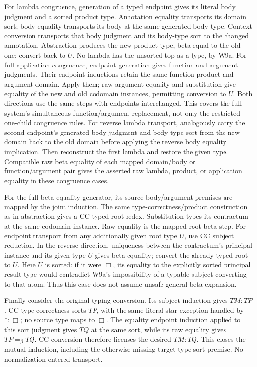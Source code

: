 For lambda congruence, generation of a typed endpoint gives its literal
body judgment and a sorted product type. Annotation equality transports
its domain sort; body equality transports its body at the same generated
body type. Context conversion transports that body judgment and its
body-type sort to the changed annotation. Abstraction produces the new
product type, beta-equal to the old one; convert back to \(U\).
No lambda has the unsorted top as a type, by W9a. For full application
congruence, endpoint generation gives function and argument judgments.
Their endpoint inductions retain the same function product and argument
domain. Apply them; raw argument equality and substitution give equality
of the new and old codomain instances, permitting conversion to \(U\).
Both directions use the same steps with endpoints interchanged.
This covers the full system's simultaneous function/argument replacement,
not only the restricted one-child congruence rules.
For reverse lambda transport, analogously carry the second endpoint's
generated body judgment and body-type sort from the new domain back to
the old domain before applying the reverse body equality implication.
Then reconstruct the first lambda and restore the given type. Compatible
raw beta equality of each mapped domain/body or function/argument pair
gives the asserted raw lambda, product, or application equality in
these congruence cases.

For the full beta equality generator, its source body/argument premises
are mapped by the joint induction. The same type-correctness/product
construction as in abstraction gives a CC-typed root redex. Substitution
types its contractum at the same codomain instance. Raw equality is the
mapped root beta step. For endpoint transport from any additionally
given root type \(U\), use CC subject reduction. In the reverse
direction, uniqueness between the contractum's principal instance and
its given type \(U\) gives beta equality; convert the already typed
root to \(U\). Here \(U\) is sorted: if it were \(\Box\), its
equality to the explicitly sorted principal result type would contradict
W9a's impossibility of a typable subject converting to that atom.
Thus this case does not assume unsafe general beta expansion.

Finally consider the original typing conversion. Its subject induction
gives \(TM:TP\). CC type correctness sorts \(TP\), with the same
literal-star exception handled by \(\ast:\Box\); no source type
maps to \(\Box\). The equality endpoint induction applied to this
sort judgment gives \(TQ\) at the same sort, while its raw equality
gives \(TP=_\beta TQ\). CC conversion therefore licenses the desired
\(TM:TQ\). This closes the mutual induction, including the otherwise
missing target-type sort premise. No normalization entered transport.


